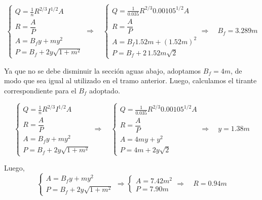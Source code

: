 \begin{equation*}
  \begin{cases}
    Q = \frac{1}{n} R^{2/3} I^{1/2} A \\
    R = \dfrac{A}{P} \\
    A = B_{f}y + m y^{2} \\
    P = B_{f} + 2 y \sqrt{1 + m^{2}}
  \end{cases}
  \Longrightarrow \quad
  \begin{cases}
    Q = \frac{1}{0.035} R^{2/3} 0.00105^{1/2} A \\
    R = \dfrac{A}{P} \\
    A = B_{f}1.52 m + (1.52 m)^2 \\
    P = B_{f} + 2 \, 1.52 m \sqrt{2}
  \end{cases}
  \Longrightarrow \quad
  B_{f} = 3.289 m
\end{equation*}

Ya que no se debe disminuir la sección aguas abajo, adoptamos $B_{f} = 4 m$, de modo que sea igual al utilizado en el tramo anterior.
Luego, calculamos el tirante correspondiente para el $B_{f}$ adoptado.

\begin{equation*}
  \begin{cases}
    Q = \frac{1}{n} R^{2/3} I^{1/2} A \\
    R = \dfrac{A}{P} \\
    A = B_{f}y + m y^{2} \\
    P = B_{f} + 2 y \sqrt{1 + m^{2}}
  \end{cases}
  \Longrightarrow \quad
  \begin{cases}
    Q = \frac{1}{0.035} R^{2/3} 0.00105^{1/2} A \\
    R = \dfrac{A}{P} \\
    A = 4 m y + y^2 \\
    P = 4 m + 2 y \sqrt{2}
  \end{cases}
  \Longrightarrow \quad
  y = 1.38 m
\end{equation*}

Luego,
\begin{equation*}
  \begin{cases}
    A = B_{f}y + m y^{2} \\
    P = B_{f} + 2 y \sqrt{1 + m^{2}}
  \end{cases}
  \Longrightarrow
  \begin{cases}
    A = 7.42 m^2 \\
    P = 7.90 m
  \end{cases}
  \Longrightarrow \quad
  R = 0.94 m
\end{equation*}


